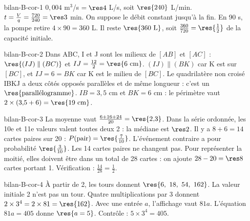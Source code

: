 \begin{blocEdition}{bilan-B-cor-1}
$0{,}004$ m$^3$/s $=\res4$ L/s, soit $\res{240}$ L/min.
$t=\frac Vq=\frac{720}{240}=\res3$ min. On suppose le débit constant jusqu’à la fin.
En 90 s, la pompe retire $4\times90=360$ L. Il reste $\res{360\ \mathrm L}$, soit $\frac{360}{720}=\res{\frac12}$ de la capacité initiale.
\end{blocEdition}
\begin{blocEdition}{bilan-B-cor-2}
Dans ABC, I et J sont les milieux de $[AB]$ et $[AC]$ : $\res{(IJ)\parallel(BC)}$ et $IJ=\frac{12}2=\res{6\ \mathrm{cm}}$.
$(IJ)\parallel(BK)$ car K est sur $[BC]$, et $IJ=6=BK$ car K est le milieu de $[BC]$. Le quadrilatère non croisé IBKJ a deux côtés opposés parallèles et de même longueur : c’est un $\res{\text{parallélogramme}}$.
$IB=3{,}5$ cm et $BK=6$ cm : le périmètre vaut $2\times(3{,}5+6)=\res{19\ \mathrm{cm}}$.\label{fig-bilan-B-cor-2}

\end{blocEdition}
\begin{blocEdition}{bilan-B-cor-3}
La moyenne vaut $\frac{6+16+24}{20}=\res{2{,}3}$. Dans la série ordonnée, les 10e et 11e valeurs valent toutes deux 2 : la médiane est $\res2$.
Il y a $8+6=14$ cartes paires sur 20 : $P(\text{pair})=\res{\frac7{10}}$. L’événement contraire a pour probabilité $\res{\frac3{10}}$.
Les 14 cartes paires ne changent pas. Pour représenter la moitié, elles doivent être dans un total de 28 cartes : on ajoute $28-20=\res8$ cartes portant 1. Vérification : $\frac{14}{28}=\frac12$.
\end{blocEdition}
\begin{blocEdition}{bilan-B-cor-4}
À partir de 2, les tours donnent $\res{6,\ 18,\ 54,\ 162}$. La valeur initiale 2 n’est pas un tour.
Quatre multiplications par 3 donnent $2\times3^4=2\times81=\res{162}$.
Avec une entrée $a$, l’affichage vaut $81a$. L’équation $81a=405$ donne $\res{a=5}$. Contrôle : $5\times3^4=405$.\label{fig-bilan-B-cor-4}

\end{blocEdition}
